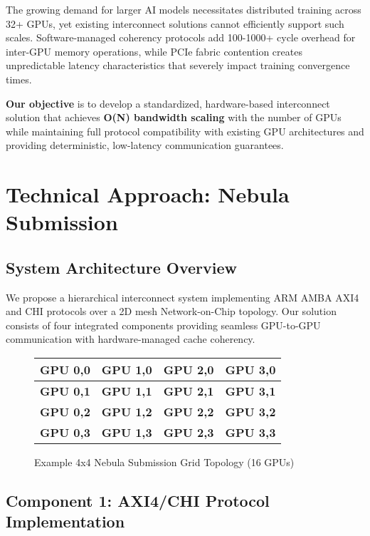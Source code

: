 \documentclass[11pt,a4paper]{article}
\begin{document}
The growing demand for larger AI models necessitates distributed training across 32+ GPUs, yet existing interconnect solutions cannot efficiently support such scales. Software-managed coherency protocols add 100-1000+ cycle overhead for inter-GPU memory operations, while PCIe fabric contention creates unpredictable latency characteristics that severely impact training convergence times.

\textbf{Our objective} is to develop a standardized, hardware-based interconnect solution that achieves \textbf{O(N) bandwidth scaling} with the number of GPUs while maintaining full protocol compatibility with existing GPU architectures and providing deterministic, low-latency communication guarantees.

\section{Technical Approach: Nebula Submission}

\subsection{System Architecture Overview}

We propose a hierarchical interconnect system implementing ARM AMBA AXI4 and CHI protocols over a 2D mesh Network-on-Chip topology. Our solution consists of four integrated components providing seamless GPU-to-GPU communication with hardware-managed cache coherency.

\begin{figure}[H]
    \centering
    \begin{tabular}{|c|c|c|c|}
        \hline
        \textbf{GPU 0,0} & \textbf{GPU 1,0} & \textbf{GPU 2,0} & \textbf{GPU 3,0} \\
        \hline
        \textbf{GPU 0,1} & \textbf{GPU 1,1} & \textbf{GPU 2,1} & \textbf{GPU 3,1} \\
        \hline
        \textbf{GPU 0,2} & \textbf{GPU 1,2} & \textbf{GPU 2,2} & \textbf{GPU 3,2} \\
        \hline
        \textbf{GPU 0,3} & \textbf{GPU 1,3} & \textbf{GPU 2,3} & \textbf{GPU 3,3} \\
        \hline
    \end{tabular}
    \caption{Example 4x4 Nebula Submission Grid Topology (16 GPUs)}
\end{figure}

\subsection{Component 1: AXI4/CHI Protocol Implementation}
\end{document}

